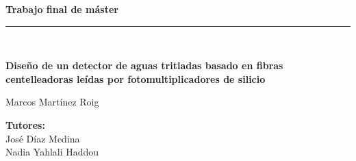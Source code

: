 \begin{titlepage}
\begin{center}
\begin{large}
\textbf{{\large Trabajo final de máster}}\\
\rule{80mm}{0.1mm}\\

\end{large}
\vspace*{0.2in}
\begin{Large}
\textbf{Diseño de un detector de aguas tritiadas basado en fibras centelleadoras leídas por fotomultiplicadores de silicio} \\
\end{Large}
\vspace*{2 cm}

\begin{large}
Marcos Martínez Roig\\
\end{large}
\end{center}

\vspace*{0.3in}
\vspace*{0.1in}
\begin{large}
\begin{flushright}
\item[\bf Tutores:\hspace{4cm} ]\quad  \\ José Díaz Medina\\
Nadia Yahlali Haddou\\
\end{flushright}
\end{large}

\end{titlepage}
